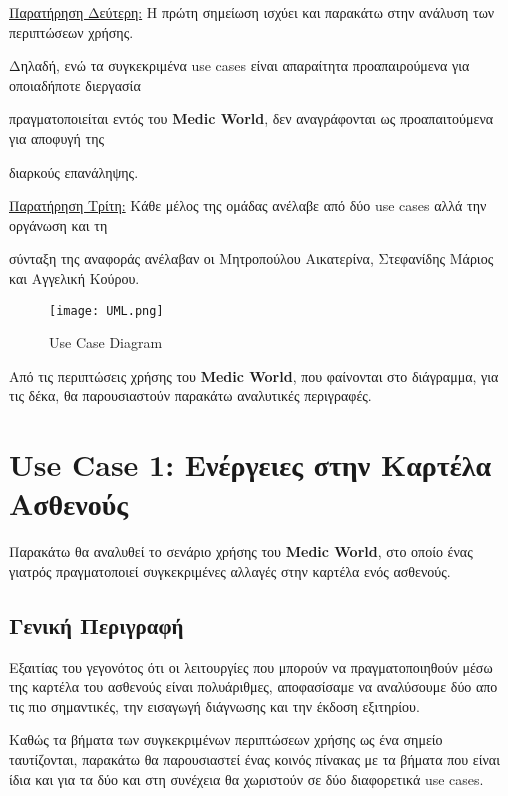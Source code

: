 \documentclass{article}
\begin{document}
\vspace{0.3cm}

\underline{Παρατήρηση Δεύτερη:} Η πρώτη σημείωση ισχύει και παρακάτω στην ανάλυση των περιπτώσεων χρήσης. \par \vspace{0.1cm} Δηλαδή, ενώ τα συγκεκριμένα use cases είναι απαραίτητα προαπαιρούμενα για οποιαδήποτε διεργασία \par πραγματοποιείται εντός του \textbf{Medic World}, δεν αναγράφονται ως προαπαιτούμενα για αποφυγή της \par διαρκούς επανάληψης.  

\vspace{0.3cm}

\underline{Παρατήρηση Τρίτη:} Κάθε μέλος της ομάδας ανέλαβε από δύο use cases αλλά την οργάνωση και τη \par \vspace{0.1cm} σύνταξη της αναφοράς ανέλαβαν οι Μητροπούλου Αικατερίνα, Στεφανίδης Μάριος και Αγγελική Κούρου.

\newpage

\begin{figure}[!htb]
        \centering
        \texttt{[image: UML.png]}
        \caption{\label{fig: UML} Use Case Diagram}
\end{figure}

\vspace{0.2cm}

Από τις περιπτώσεις χρήσης του \textbf{Medic World}, που φαίνονται στο διάγραμμα, για τις δέκα, θα παρουσιαστούν παρακάτω αναλυτικές περιγραφές.

\newpage

\section{Use Case 1: Ενέργειες στην Καρτέλα Ασθενούς}

Παρακάτω θα αναλυθεί το σενάριο χρήσης του \textbf{Medic World}, στο οποίο ένας γιατρός πραγματοποιεί συγκεκριμένες αλλαγές στην καρτέλα ενός ασθενούς.

\subsection{Γενική Περιγραφή}

Εξαιτίας του γεγονότος ότι οι λειτουργίες που μπορούν να πραγματοποιηθούν μέσω της καρτέλα του ασθενούς είναι πολυάριθμες, αποφασίσαμε να αναλύσουμε δύο απο τις πιο σημαντικές, την εισαγωγή διάγνωσης και την έκδοση εξιτηρίου.
\par Καθώς τα βήματα των συγκεκριμένων περιπτώσεων χρήσης ως ένα σημείο ταυτίζονται, παρακάτω θα παρουσιαστεί ένας κοινός πίνακας με τα βήματα που είναι ίδια και για τα δύο και στη συνέχεια θα χωριστούν σε δύο διαφορετικά use cases. 
\end{document}

